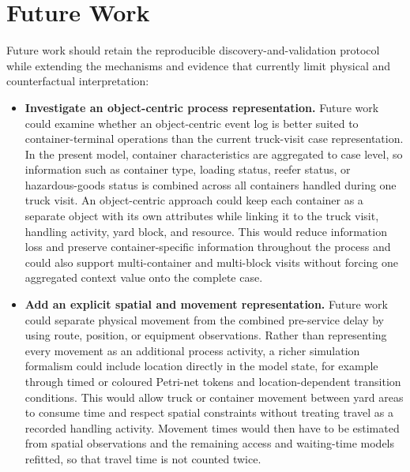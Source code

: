 \section{Future Work}
\label{sec:future_work}

Future work should retain the reproducible discovery-and-validation protocol
while extending the mechanisms and evidence that currently limit physical and
counterfactual interpretation:

\begin{itemize}
    \item \textbf{Investigate an object-centric process representation.}
    Future work could examine whether an object-centric event log is better
    suited to container-terminal operations than the current truck-visit case
    representation. In the present model, container characteristics are
    aggregated to case level, so information such as container type, loading
    status, reefer status, or hazardous-goods status is combined across all
    containers handled during one truck visit. An object-centric approach could
    keep each container as a separate object with its own attributes while
    linking it to the truck visit, handling activity, yard block, and resource.
    This would reduce information loss and preserve container-specific information throughout the process
    and could also support multi-container and multi-block visits without
    forcing one aggregated context value onto the complete case.

    \item \textbf{Add an explicit spatial and movement representation.}
    Future work could separate physical movement from the combined
    pre-service delay by using route, position, or equipment observations.
    Rather than representing every movement as an additional process activity,
    a richer simulation formalism could include location directly in the model
    state, for example through timed or coloured Petri-net tokens and
    location-dependent transition conditions. This would allow truck or
    container movement between yard areas to consume time and respect spatial
    constraints without treating travel as a recorded handling activity.
    Movement times would then have to be estimated from spatial observations
    and the remaining access and waiting-time models refitted, so that travel
    time is not counted twice.


\end{itemize}

